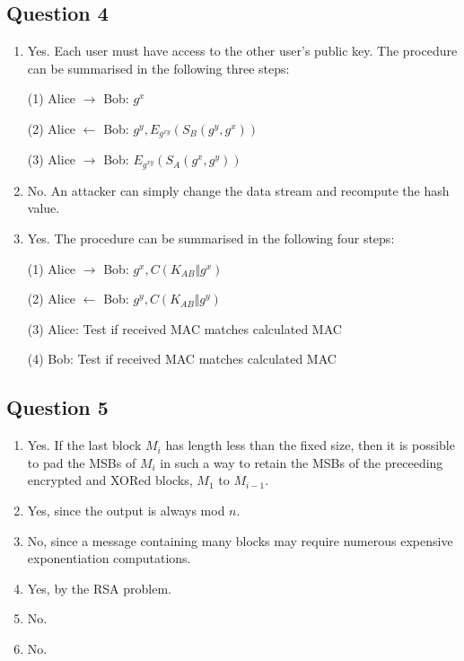 \documentclass[12pt]{article}
\begin{document}
\subsection*{Question 4}
\begin{enumerate}
\item Yes. Each user must have access to the other user's public key. The procedure can be summarised in the following three steps:
\begin{center}
(1) Alice $\rightarrow$ Bob: $g^{x}$

(2) Alice $\leftarrow$ Bob: $g^{y}, E_{g^{xy}}(S_{B}(g^{y}, g^{x}))$

(3) Alice $\rightarrow$ Bob: $E_{g^{xy}}(S_{A}(g^{x}, g^{y}))$
\end{center}

\item No. An attacker can simply change the data stream and recompute the hash value.

\item Yes. The procedure can be summarised in the following four steps:
\begin{center}
(1) Alice $\rightarrow$ Bob: $g^{x}, C(K_{AB} \Vert g^{x})$

(2) Alice $\leftarrow$ Bob: $g^{y}, C(K_{AB} \Vert g^{y})$

(3) Alice: Test if received MAC matches calculated MAC

(4) Bob: Test if received MAC matches calculated MAC
\end{center}
\end{enumerate}


\subsection*{Question 5}
\begin{enumerate}
\item Yes. If the last block $M_{i}$ has length less than the fixed size, then it is possible to
pad the MSBs of $M_{i}$ in such a way to retain the MSBs of the preceeding encrypted 
and XORed blocks, $M_{1}$ to $M_{i-1}$.

\item Yes, since the output is always mod $n$.

\item No, since a message containing many blocks may require numerous expensive exponentiation computations.

\item Yes, by the RSA problem.

\item No.

\item No.
\end{enumerate}
\end{document}
